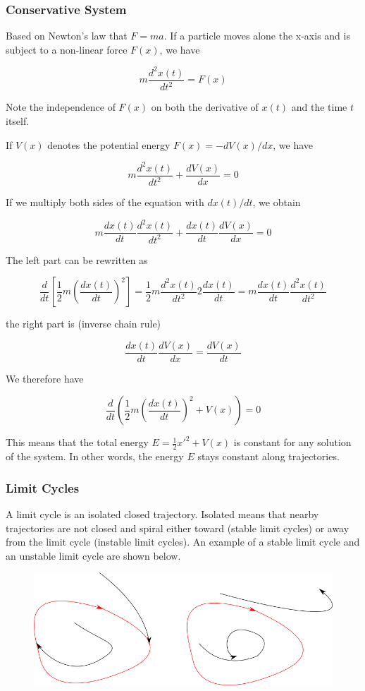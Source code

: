 
\subsubsection{Conservative System}

Based on Newton's law that $F=ma$. If a particle moves alone the x-axis and is subject to a non-linear force $F(x)$, we have

\[m \frac{d^2x(t)}{dt^2} = F(x)\]

Note the independence of $F(x)$ on both the derivative of $x(t)$ and the time $t$ itself.

If $V(x)$ denotes the potential energy $F(x) = - dV(x)/dx$, we have

\[m \frac{d^2x(t)}{dt^2} + \frac{dV(x)}{dx} = 0\]

If we multiply both sides of the equation with $dx(t)/dt$, we obtain

\[m \frac{dx(t)}{dt} \frac{d^2 x(t)}{dt^2} + \frac{dx(t)}{dt} \frac{dV(x)}{dx} = 0\]

The left part can be rewritten as

\[
\frac{d}{dt} \left[ \frac{1}{2} m \left(\frac{dx(t)}{dt}\right)^2 \right] = \frac{1}{2} m \frac{d^2 x(t)}{dt^2} 2 \frac{dx(t)}{dt} = m \frac{dx(t)}{dt} \frac{d^2 x(t)}{dt^2}
\]

the right part is (inverse chain rule)

\[
\frac{dx(t)}{dt} \frac{dV(x)}{dx} = \frac{dV(x)}{dt}
\]

We therefore have

\[
\frac{d}{dt} \left( \frac{1}{2} m \left(\frac{dx(t)}{dt}\right)^2 + V(x) \right) = 0
\]

This means that the total energy $E = \frac{1}{2} x'^2 + V(x)$ is constant for any solution of the system. In other words, the energy $E$ stays constant along trajectories.

\subsubsection{Limit Cycles}

A limit cycle is an isolated closed trajectory. Isolated means that nearby trajectories are not closed and spiral either toward (stable limit cycles) or away from the limit cycle (instable limit cycles). An example of a stable limit cycle and an unstable limit cycle are shown below.

\begin{figure}[H]
\includegraphics[scale=0.7]{images/strogatz_2_1.png}
\end{figure}

